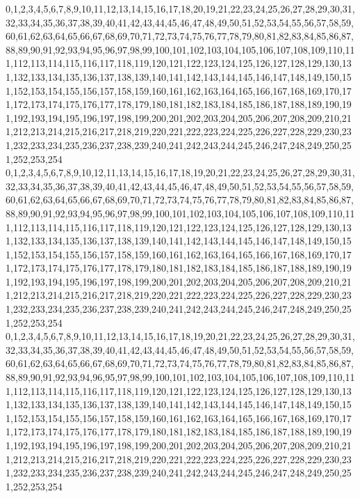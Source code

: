 \documentclass[12pt]{article}
\begin{document}
{0,1,2,3,4,5,6,7,8,9,10,11,12,13,14,15,16,17,18,20,19,21,22,23,24,25,26,27,28,29,30,31,32,33,34,35,36,37,38,39,40,41,42,43,44,45,46,47,48,49,50,51,52,53,54,55,56,57,58,59,60,61,62,63,64,65,66,67,68,69,70,71,72,73,74,75,76,77,78,79,80,81,82,83,84,85,86,87,88,89,90,91,92,93,94,95,96,97,98,99,100,101,102,103,104,105,106,107,108,109,110,111,112,113,114,115,116,117,118,119,120,121,122,123,124,125,126,127,128,129,130,131,132,133,134,135,136,137,138,139,140,141,142,143,144,145,146,147,148,149,150,151,152,153,154,155,156,157,158,159,160,161,162,163,164,165,166,167,168,169,170,171,172,173,174,175,176,177,178,179,180,181,182,183,184,185,186,187,188,189,190,191,192,193,194,195,196,197,198,199,200,201,202,203,204,205,206,207,208,209,210,211,212,213,214,215,216,217,218,219,220,221,222,223,224,225,226,227,228,229,230,231,232,233,234,235,236,237,238,239,240,241,242,243,244,245,246,247,248,249,250,251,252,253,254\\
0,1,2,3,4,5,6,7,8,9,10,12,11,13,14,15,16,17,18,19,20,21,22,23,24,25,26,27,28,29,30,31,32,33,34,35,36,37,38,39,40,41,42,43,44,45,46,47,48,49,50,51,52,53,54,55,56,57,58,59,60,61,62,63,64,65,66,67,68,69,70,71,72,73,74,75,76,77,78,79,80,81,82,83,84,85,86,87,88,89,90,91,92,93,94,95,96,97,98,99,100,101,102,103,104,105,106,107,108,109,110,111,112,113,114,115,116,117,118,119,120,121,122,123,124,125,126,127,128,129,130,131,132,133,134,135,136,137,138,139,140,141,142,143,144,145,146,147,148,149,150,151,152,153,154,155,156,157,158,159,160,161,162,163,164,165,166,167,168,169,170,171,172,173,174,175,176,177,178,179,180,181,182,183,184,185,186,187,188,189,190,191,192,193,194,195,196,197,198,199,200,201,202,203,204,205,206,207,208,209,210,211,212,213,214,215,216,217,218,219,220,221,222,223,224,225,226,227,228,229,230,231,232,233,234,235,236,237,238,239,240,241,242,243,244,245,246,247,248,249,250,251,252,253,254\\
0,1,2,3,4,5,6,7,8,9,10,11,12,13,14,15,16,17,18,19,20,21,22,23,24,25,26,27,28,29,30,31,32,33,34,35,36,37,38,39,40,41,42,43,44,45,46,47,48,49,50,51,52,53,54,55,56,57,58,59,60,61,62,63,64,65,66,67,68,69,70,71,72,73,74,75,76,77,78,79,80,81,82,83,84,85,86,87,88,89,90,91,92,93,94,96,95,97,98,99,100,101,102,103,104,105,106,107,108,109,110,111,112,113,114,115,116,117,118,119,120,121,122,123,124,125,126,127,128,129,130,131,132,133,134,135,136,137,138,139,140,141,142,143,144,145,146,147,148,149,150,151,152,153,154,155,156,157,158,159,160,161,162,163,164,165,166,167,168,169,170,171,172,173,174,175,176,177,178,179,180,181,182,183,184,185,186,187,188,189,190,191,192,193,194,195,196,197,198,199,200,201,202,203,204,205,206,207,208,209,210,211,212,213,214,215,216,217,218,219,220,221,222,223,224,225,226,227,228,229,230,231,232,233,234,235,236,237,238,239,240,241,242,243,244,245,246,247,248,249,250,251,252,253,254\\
}
\end{document}
